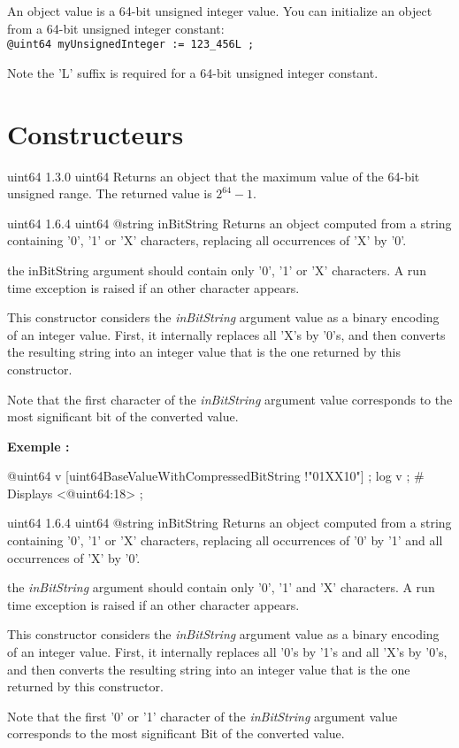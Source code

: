 

An  object value is a 64-bit unsigned integer value. You can initialize an  object from a 64-bit unsigned integer constant:\\

\texttt{@uint64 myUnsignedInteger := 123\_456L ;}\newline

Note the 'L' suffix is required for a 64-bit unsigned integer constant.

\section{Constructeurs}

{uint64}
{1.3.0}
{uint64}
{Returns an  object that the maximum value of the 64-bit unsigned range.}
{The returned value is $2^{64}-1$.}


{uint64}
{1.6.4}
{uint64}
{@string inBitString}
{Returns an  object computed from a string containing '0', '1' or 'X' characters, replacing all occurrences of 'X' by '0'.}
{the inBitString argument should contain only '0', '1' or 'X' characters. A run time exception is raised if an other character appears.

This constructor considers the \emph{inBitString} argument value as a binary encoding of an integer value. First, it internally replaces all 'X's by '0's, and then converts the resulting string into an integer value that is the one returned by this constructor.

Note that the first character of the \emph{inBitString} argument value corresponds to the most significant bit of the converted value.}


\textbf{Exemple :}
\begin{galgascode}
@uint64 v [uint64BaseValueWithCompressedBitString !"01XX10"] ;
log v ; # Displays <@uint64:18> ;
\end{galgascode}





{uint64}
{1.6.4}
{uint64}
{@string inBitString}
{Returns an  object computed from a string containing '0', '1' or 'X' characters, replacing all occurrences of '0' by '1' and all occurrences of 'X' by '0'.}
{the \emph{inBitString} argument should contain only '0', '1' and 'X' characters. A run time exception is raised if an other character appears.

This constructor considers the \emph{inBitString} argument value as a binary encoding of an integer value. First, it internally replaces all '0's by '1's and all 'X's by '0's, and then converts the resulting string into an integer value that is the one returned by this constructor.

Note that the first '0' or '1' character of the \emph{inBitString} argument value corresponds to the most significant Bit of the converted value.}

